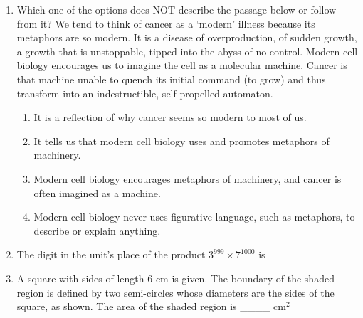 \documentclass[12pt]{article}
\theoremstyle{remark}
\begin{document}
\begin{enumerate}
\begin{enumerate}  \end{enumerate}
\hfill{}
\item Which one of the options does NOT describe the passage below or follow from it? 
 We tend to think of cancer as a ‘modern’ illness because its metaphors are so modern. It is a disease of overproduction, of sudden growth, a growth that is unstoppable, tipped into the abyss of no control. Modern cell biology encourages us to imagine the cell as a molecular machine. Cancer is that machine unable to quench its initial command (to grow) and thus transform into an indestructible, self-propelled automaton.\\
\begin{enumerate}
\item   It is a reflection of why cancer seems so modern to most of us. 
\item   It tells us that modern cell biology uses and promotes metaphors of machinery. 
\item   Modern cell biology encourages metaphors of machinery, and cancer is often imagined as a machine. 
\item   Modern cell biology never uses figurative language, such as metaphors, to describe or explain anything. 
\end{enumerate}
\hfill{}
\item The digit in the unit’s place of the product $3^{999} \times 7^{1000}$ is \\ 
\begin{enumerate}  \end{enumerate}
\hfill{}
\item A square with sides of length 6 cm is given. The boundary of the shaded region is defined by two semi-circles whose diameters are the sides of the square, as shown. The area of the shaded region is \_\_\_\_ cm$^2$

\end{enumerate}
\end{document}

